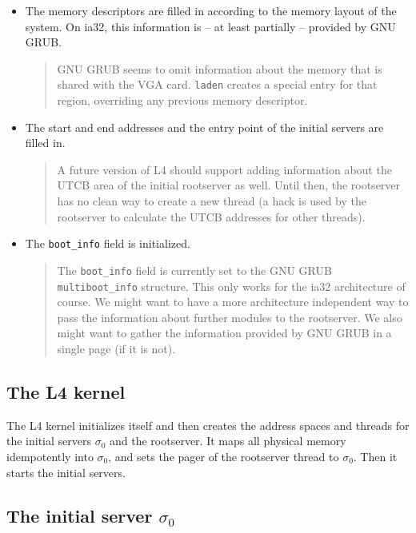 \documentclass[9pt,a4paper]{extarticle}
\newenvironment{comment}{\footnotesize \begin{quote}}{\end{quote}}
\begin{document}
\begin{itemize}
\item The memory descriptors are filled in according to the memory
  layout of the system.  On ia32, this information is -- at least
  partially -- provided by GNU GRUB.

  \begin{comment}
    GNU GRUB seems to omit information about the memory that is shared
    with the VGA card.  \texttt{laden} creates a special entry for
    that region, overriding any previous memory descriptor.
  \end{comment}
  
\item The start and end addresses and the entry point of the initial
  servers are filled in.

  \begin{comment}
    A future version of L4 should support adding information about the
    UTCB area of the initial rootserver as well.  Until then, the
    rootserver has no clean way to create a new thread (a hack is used
    by the rootserver to calculate the UTCB addresses for other
    threads).
  \end{comment}

\item The \verb/boot_info/ field is initialized.

  \begin{comment}
    The \verb/boot_info/ field is currently set to the GNU GRUB
    \verb/multiboot_info/ structure.  This only works for the ia32
    architecture of course.  We might want to have a more architecture
    independent way to pass the information about further modules to
    the rootserver.  We also might want to gather the information
    provided by GNU GRUB in a single page (if it is not).
  \end{comment}
\end{itemize}


\subsection{The L4 kernel}

The L4 kernel initializes itself and then creates the address spaces
and threads for the initial servers $\sigma_0$ and the rootserver.  It
maps all physical memory idempotently into $\sigma_0$, and sets the
pager of the rootserver thread to $\sigma_0$.  Then it starts the
initial servers.


\subsection{The initial server $\sigma_0$}
\end{document}
